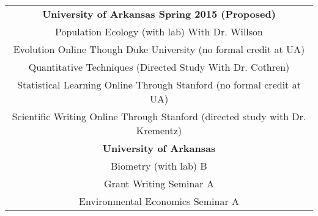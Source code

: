 \documentclass[letterpaper,11pt]{article}
\begin{document}
	\begin{center}\begin{tabular*}{6.6in}{l@{\extracolsep{\fill}}r}

\multicolumn{2}{c}{\bf University of Arkansas Spring 2015 (Proposed) \cftdotfill{\cftdotsep}}\\
\multicolumn{2}{c}{Population Ecology (with lab) \cftdotfill{\cftdotsep}With Dr. Willson}\\
\multicolumn{2}{c}{Evolution \cftdotfill{\cftdotsep} Online Though Duke University (no formal credit at UA)}\\
\multicolumn{2}{c}{Quantitative Techniques  \cftdotfill{\cftdotsep}(Directed Study With Dr. Cothren)}\\
\multicolumn{2}{c}{Statistical Learning \cftdotfill{\cftdotsep} Online Through Stanford (no formal credit at UA)}\\
\multicolumn{2}{c}{Scientific Writing \cftdotfill{\cftdotsep} Online Through Stanford (directed study with Dr. Krementz)}\\

\multicolumn{2}{c}{\bf University of Arkansas  \cftdotfill{\cftdotsep}}\\
\multicolumn{2}{c}{Biometry (with lab) \cftdotfill{\cftdotsep} B}\\
\multicolumn{2}{c}{Grant Writing Seminar \cftdotfill{\cftdotsep} A}\\
\multicolumn{2}{c}{Environmental Economics Seminar \cftdotfill{\cftdotsep} A}\\


\end{tabular*}
\end{center}
\end{document}
